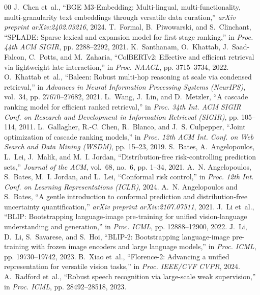\begin{thebibliography}{00}
J.~Chen et~al., ``BGE M3-Embedding: Multi-lingual, multi-functionality, multi-granularity text embeddings through versatile data curation,'' \emph{arXiv preprint arXiv:2402.03216}, 2024.
T.~Formal, B.~Piwowarski, and S.~Clinchant, ``SPLADE: Sparse lexical and expansion model for first stage ranking,'' in \emph{Proc. 44th ACM SIGIR}, pp. 2288--2292, 2021.
K.~Santhanam, O.~Khattab, J.~Saad-Falcon, C.~Potts, and M.~Zaharia, ``ColBERTv2: Effective and efficient retrieval via lightweight late interaction,'' in \emph{Proc. NAACL}, pp. 3715--3734, 2022.
O.~Khattab et~al., ``Baleen: Robust multi-hop reasoning at scale via condensed retrieval,'' in \emph{Advances in Neural Information Processing Systems (NeurIPS)}, vol.~34, pp. 27670--27682, 2021.
L.~Wang, J.~Lin, and D.~Metzler, ``A cascade ranking model for efficient ranked retrieval,'' in \emph{Proc. 34th Int. ACM SIGIR Conf. on Research and Development in Information Retrieval (SIGIR)}, pp. 105--114, 2011.
L.~Gallagher, R.-C. Chen, R.~Blanco, and J.~S. Culpepper, ``Joint optimization of cascade ranking models,'' in \emph{Proc. 12th ACM Int. Conf. on Web Search and Data Mining (WSDM)}, pp. 15--23, 2019.
S.~Bates, A.~Angelopoulos, L.~Lei, J.~Malik, and M.~I. Jordan, ``Distribution-free risk-controlling prediction sets,'' \emph{Journal of the ACM}, vol.~68, no.~6, pp. 1--34, 2021.
A.~N. Angelopoulos, S.~Bates, M.~I. Jordan, and L.~Lei, ``Conformal risk control,'' in \emph{Proc. 12th Int. Conf. on Learning Representations (ICLR)}, 2024.
A.~N. Angelopoulos and S.~Bates, ``A gentle introduction to conformal prediction and distribution-free uncertainty quantification,'' \emph{arXiv preprint arXiv:2107.07511}, 2021.
J.~Li et~al., ``BLIP: Bootstrapping language-image pre-training for unified vision-language understanding and generation,'' in \emph{Proc. ICML}, pp. 12888--12900, 2022.
J.~Li, D.~Li, S.~Savarese, and S.~Hoi, ``BLIP-2: Bootstrapping language-image pre-training with frozen image encoders and large language models,'' in \emph{Proc. ICML}, pp. 19730--19742, 2023.
B.~Xiao et~al., ``Florence-2: Advancing a unified representation for versatile vision tasks,'' in \emph{Proc. IEEE/CVF CVPR}, 2024.
A.~Radford et~al., ``Robust speech recognition via large-scale weak supervision,'' in \emph{Proc. ICML}, pp. 28492--28518, 2023.

\end{thebibliography}
